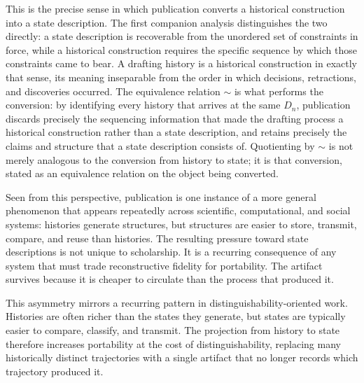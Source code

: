 \documentclass[11pt]{article}
\begin{document}
This is the precise sense in which publication converts a historical construction into a state description. The first companion analysis distinguishes the two directly: a state description is recoverable from the unordered set of constraints in force, while a historical construction requires the specific sequence by which those constraints came to bear. A drafting history is a historical construction in exactly that sense, its meaning inseparable from the order in which decisions, retractions, and discoveries occurred. The equivalence relation $\sim$ is what performs the conversion: by identifying every history that arrives at the same $D_n$, publication discards precisely the sequencing information that made the drafting process a historical construction rather than a state description, and retains precisely the claims and structure that a state description consists of. Quotienting by $\sim$ is not merely analogous to the conversion from history to state; it is that conversion, stated as an equivalence relation on the object being converted.

Seen from this perspective, publication is one instance of a more general phenomenon that appears repeatedly across scientific, computational, and social systems: histories generate structures, but structures are easier to store, transmit, compare, and reuse than histories. The resulting pressure toward state descriptions is not unique to scholarship. It is a recurring consequence of any system that must trade reconstructive fidelity for portability. The artifact survives because it is cheaper to circulate than the process that produced it.

This asymmetry mirrors a recurring pattern in distinguishability-oriented work. Histories are often richer than the states they generate, but states are typically easier to compare, classify, and transmit. The projection from history to state therefore increases portability at the cost of distinguishability, replacing many historically distinct trajectories with a single artifact that no longer records which trajectory produced it.
\end{document}
